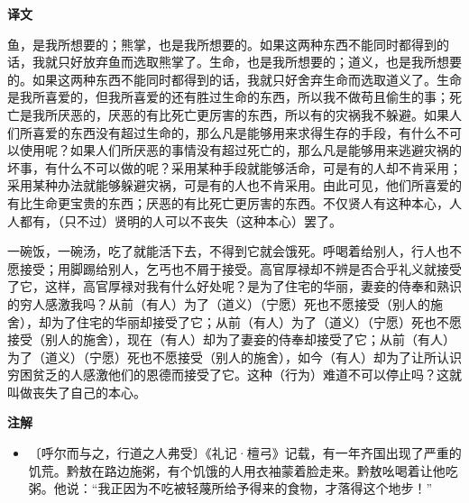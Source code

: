 \documentclass[12pt,UTF-8,openany,a4]{ctexbook}
\begin{document}
\newpage

\begin{Large}
    \noindent\textbf{译文}
\end{Large}


\vspace{1em}

\begin{large}
    \yiwen 
    鱼，是我所想要的；熊掌，也是我所想要的。如果这两种东西不能同时都得到的话，我就只好放弃鱼而选取熊掌了。生命，也是我所想要的；道义，也是我所想要的。如果这两种东西不能同时都得到的话，我就只好舍弃生命而选取道义了。生命是我所喜爱的，但我所喜爱的还有胜过生命的东西，所以我不做苟且偷生的事；死亡是我所厌恶的，厌恶的有比死亡更厉害的东西，所以有的灾祸我不躲避。如果人们所喜爱的东西没有超过生命的，那么凡是能够用来求得生存的手段，有什么不可以使用呢？如果人们所厌恶的事情没有超过死亡的，那么凡是能够用来逃避灾祸的坏事，有什么不可以做的呢？采用某种手段就能够活命，可是有的人却不肯采用；采用某种办法就能够躲避灾祸，可是有的人也不肯采用。由此可见，他们所喜爱的有比生命更宝贵的东西；厌恶的有比死亡更厉害的东西。不仅贤人有这种本心，人人都有，（只不过）贤明的人可以不丧失（这种本心）罢了。
    
    一碗饭，一碗汤，吃了就能活下去，不得到它就会饿死。呼喝着给别人，行人也不愿接受；用脚踢给别人，乞丐也不屑于接受。高官厚禄却不辨是否合乎礼义就接受了它，这样，高官厚禄对我有什么好处呢？是为了住宅的华丽，妻妾的侍奉和熟识的穷人感激我吗？从前（有人）为了（道义）（宁愿）死也不愿接受（别人的施舍），却为了住宅的华丽却接受了它；从前（有人）为了（道义）（宁愿）死也不愿接受（别人的施舍），现在（有人）却为了妻妾的侍奉却接受了它；从前（有人）为了（道义）（宁愿）死也不愿接受（别人的施舍），如今（有人）却为了让所认识穷困贫乏的人感激他们的恩德而接受了它。这种（行为）难道不可以停止吗？这就叫做丧失了自己的本心。
    
\end{large}


\newpage

\begin{Large}
    \noindent\textbf{注解}
\end{Large}


\vspace{-1em}

\begin{itemize}
    \setlength\itemsep{-0.2em}
    \item〔呼尔而与之，行道之人弗受〕{\yiwen 《礼记·檀弓》记载，有一年齐国出现了严重的饥荒。黔敖在路边施粥，有个饥饿的人用衣袖蒙着脸走来。黔敖吆喝着让他吃粥。他说：“我正因为不吃被轻蔑所给予得来的食物，才落得这个地步！”}
\end{itemize}
\end{document}
